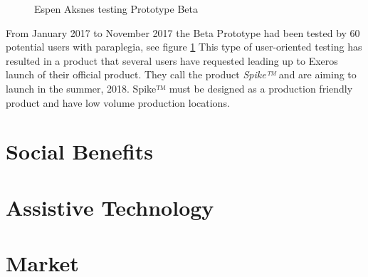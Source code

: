 \begin{figure}
    {\setlength{\fboxsep}{0pt}\setlength{\fboxrule}{0.5pt}
    }
    \centering
    \captionsetup{justification=centering}
    \caption{Espen Aksnes testing Prototype Beta}
    \label{betatest}    
\end{figure}


From January 2017 to November 2017 the Beta Prototype had been tested by 60 potential users with paraplegia, see figure \ref{betatest} This type of user-oriented testing has resulted in a product that several users have requested leading up to Exeros launch of their official product. They call the product \textit{Spike™} and are aiming to launch in the summer, 2018. Spike™ must be designed as a production friendly product and have low volume production locations. 



\section{Social Benefits}


\section{Assistive Technology}

\section{Market}


